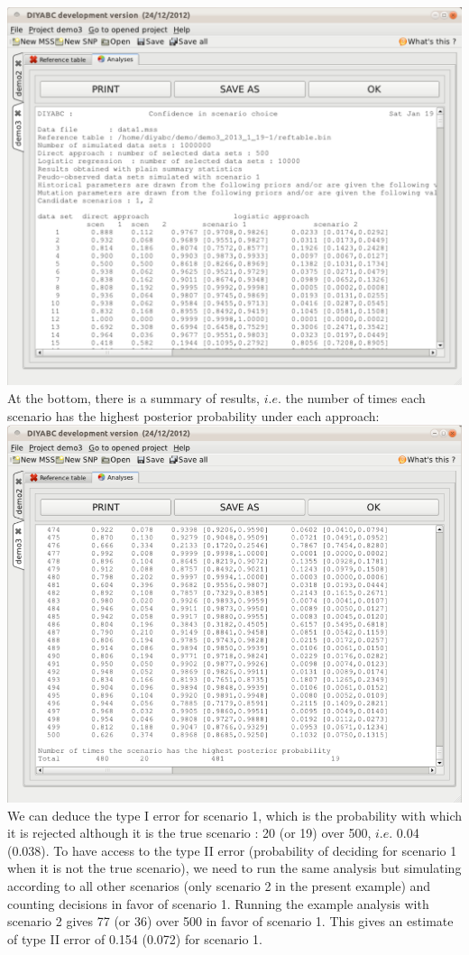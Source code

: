 \includegraphics[scale=0.38]{gui_pictures/Capture-DIYABC-119.png} \\

At the bottom, there is a summary of results, $i.e.$ the number of times each scenario has the highest posterior probability under each approach:\\

\includegraphics[scale=0.33]{gui_pictures/Capture-DIYABC-120.png} \\

We can deduce the type I error for scenario 1,  which is the probability with which it is rejected although it is the true scenario : 20 (or 19) over 500, $i.e.$ 0.04 (0.038). To have access to the type II error (probability of deciding for scenario 1 when it is not the true scenario), we need to run the same analysis but simulating according to all other scenarios (only scenario 2 in the present example) and counting decisions in favor of scenario 1. Running the example analysis with scenario 2 gives 77 (or 36) over 500 in favor of scenario 1. This gives an estimate of type II error of 0.154 (0.072) for scenario 1.

